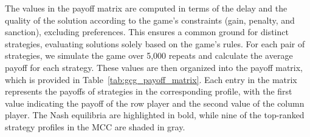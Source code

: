         \noindent
        The values in the payoff matrix are computed in terms of the delay and the quality of the solution according to the game's constraints (gain, penalty, and sanction), excluding preferences. This ensures a common ground for distinct strategies, evaluating solutions solely based on the game's rules. For each pair of strategies, we simulate the game over 5,000 repeats and calculate the average payoff for each strategy. These values are then organized into the payoff matrix, which is provided in Table~\ref{tab:gcg_payoff_matrix}. Each entry in the matrix represents the payoffs of strategies in the corresponding profile, with the first value indicating the payoff of the row player and the second value of the column player. The Nash equilibria are highlighted in bold, while nine of the top-ranked strategy profiles in the MCC are shaded in gray.
